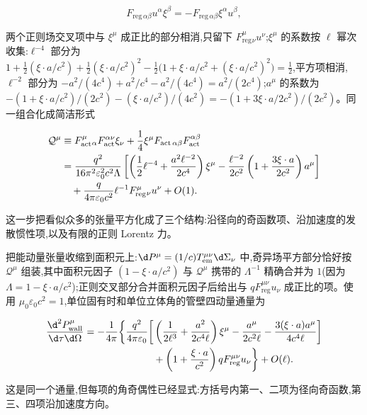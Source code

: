\begin{equation*}
 F_{\mathrm{reg}\,\alpha\beta}u^\alpha\xi^\beta
 =-F_{\mathrm{reg}\,\alpha\beta}\xi^\alpha u^\beta,
\end{equation*}

两个正则场交叉项中与 $\xi^\mu$ 成正比的部分相消,只留下 $F_{\mathrm{reg}}^\mu{}_\nu u^\nu$;$\xi^\mu$ 的系数按 $\ell$ 幂次收集:$\ell^{-4}$ 部分为 $1+\frac12(\xi\cdot a/c^2)+\frac12(\xi\cdot a/c^2)^2-\frac12\bigl(1+\xi\cdot a/c^2+(\xi\cdot a/c^2)^2\bigr)=\frac12$,平方项相消,$\ell^{-2}$ 部分为 $-a^2/(4c^4)+a^2/c^4-a^2/(4c^4)=a^2/(2c^4)$;$a^\mu$ 的系数为 $-(1+\xi\cdot a/c^2)/(2c^2)-(\xi\cdot a/c^2)/(4c^2)=-(1+3\xi\cdot a/2c^2)/(2c^2)$。同一组合化成简洁形式

\begin{align*}
 \mathcal Q^\mu
 &\equiv
 F_{\mathrm{act}}^\mu{}_\alpha
 F_{\mathrm{act}}^{\alpha\nu}\xi_\nu
 +{1\over4}\xi^\mu
 F_{\mathrm{act}\,\alpha\beta}F_{\mathrm{act}}^{\alpha\beta}\\
 &={q^2\over16\pi^2\varepsilon_0^2c^2\Lambda}
 \left[
 \left({1\over2}\ell^{-4}
 +{a^2\ell^{-2}\over2c^4}\right)\xi^\mu
 -{\ell^{-2}\over2c^2}
 \left(1+{3\xi\cdot a\over2c^2}\right)a^\mu
 \right]\\
 &\quad
 +{q\over4\pi\varepsilon_0c^2}\ell^{-1}
 F_{\mathrm{reg}}^\mu{}_\nu u^\nu
 +O(1).
\end{align*}

这一步把看似众多的张量平方化成了三个结构:沿径向的奇函数项、沿加速度的发散惯性项,以及有限的正则 Lorentz 力。

把能动量张量收缩到面积元上:$\d P^\mu=(1/c)T_{\mathrm{em}}^{\mu\nu}\d\Sigma_\nu$ 中,奇异场平方部分恰好按 $\mathcal Q^\mu$ 组装,其中面积元因子 $(1-\xi\cdot a/c^2)$ 与 $\mathcal Q^\mu$ 携带的 $\Lambda^{-1}$ 精确合并为 $1$(因为 $\Lambda=1-\xi\cdot a/c^2$);正则交叉部分合并面积元因子后给出与 $qF_{\mathrm{reg}}^{\mu\nu}u_\nu$ 成正比的项。使用 $\mu_0\varepsilon_0c^2=1$,单位固有时和单位立体角的管壁四动量通量为

\begin{align*}
 {\d^2P_{\mathrm{wall}}^\mu\over\d\tau\d\Omega}
 =-{1\over4\pi}\bigg\{ {q^2\over4\pi\varepsilon_0}
 \bigg[{}
 &\left({1\over2\ell^3}
 +{a^2\over2c^4\ell}\right)\xi^\mu
 -{a^\mu\over2c^2\ell}
 -{3(\xi\cdot a)a^\mu\over4c^4\ell}
 \bigg]\\
 &+\left(1+{\xi\cdot a\over c^2}\right)
 qF_{\mathrm{reg}}^{\mu\nu}u_\nu
 \bigg\}+O(\ell).
\end{align*}

这是同一个通量,但每项的角奇偶性已经显式:方括号内第一、二项为径向奇函数,第三、四项沿加速度方向。

